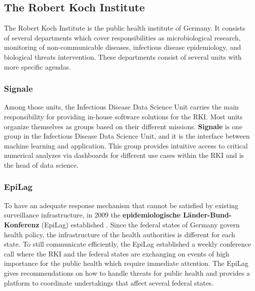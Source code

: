 \subsection{The Robert Koch Institute}
The Robert Koch Institute is the public health institute of Germany.
It consists of several departments which cover responsibilities as microbiological research, monitoring of non-communicable diseases, infectious disease epidemiology, and biological threats intervention.
These departments consist of several units with more specific agendas.

\subsubsection{Signale}
Among those units, the Infectious Disease Data Science Unit carries the main responsibility for providing in-house software solutions for the RKI.
Most units organize themselves as groups based on their different missions.
\textbf{Signale} is one group in the Infectious Disease Data Science Unit, and it is the interface between machine learning and application.
This group provides intuitive access to critical numerical analyzes via dashboards for different use cases within the RKI and is the head of data science.

\subsubsection{EpiLag}
To have an adequate response mechanism that cannot be satisfied by existing surveillance infrastructure, in 2009 the \textbf{epidemiologische L\"ander-Bund-Konferenz} (\gls{EpiLag})  established \citep{Mohr2010}.
Since the federal states of Germany govern health policy, the infrastructure of the health authorities is different for each state.
To still communicate efficiently, the EpiLag established a weekly conference call where the RKI and the federal states are exchanging on events of high importance for the public health which require immediate attention.
The EpiLag gives recommendations on how to handle threats for public health and provides a platform to coordinate undertakings that affect several federal states.

